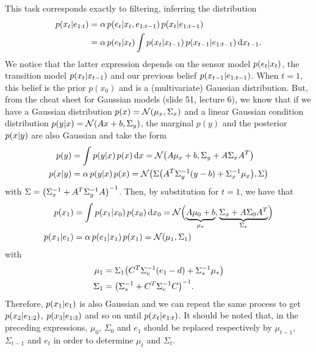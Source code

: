 \documentclass[11pt, a4paper]{article}
\begin{document}
\begin{enumerate}
    \begin{solution}
        This task corresponds exactly to filtering, \ie{} inferring the distribution
        \begin{align*}
            p(x_t \knowing e_{1:t}) & = \alpha \, p(e_t \knowing x_t, e_{1:t-1}) \, p(x_t \knowing e_{1:t-1}) \\
            & = \alpha \, p(e_t \knowing x_t) \int p(x_t \knowing x_{t-1}) \, p(x_{t-1} \knowing e_{1:t-1}) \d{x_{t-1}} .
        \end{align*}
        We notice that the latter expression depends on the sensor model $p(e_t \knowing x_t)$, the transition model $p(x_t \knowing x_{t-1})$ and our previous belief $p(x_{t-1} \knowing e_{1:t-1})$. When $t = 1$, this belief is the prior $p(x_0)$ and is a (multivariate) Gaussian distribution. But, from the cheat sheet for Gaussian models (slide 51, lecture 6), we know that if we have a Gaussian distribution $p(x) = \N(\mu_x, \Sigma_x)$ and a linear Gaussian condition distribution $p(y \knowing x) = \N(A x + b, \Sigma_y)$, the marginal $p(y)$ and the posterior $p(x \knowing y)$ are also Gaussian and take the form
        \begin{align*}
            p(y) & = \int p(y \knowing x) \, p(x) \d{x} = \N\rbk*{A \mu_x + b, \Sigma_y + A \Sigma_x A^T} \\
            p(x \knowing y) & = \alpha \, p(y \knowing x) \, p(x) = \N\rbk*{\Sigma \rbk*{A^T \Sigma_y^{-1} (y - b) + \Sigma_x^{-1} \mu_x}, \Sigma}
        \end{align*}
        with $\Sigma = \rbk*{\Sigma_x^{-1} + A^T \Sigma_y^{-1} A}^{-1}$. Then, by substitution for $t = 1$, we have that
        \begin{align*}
            p(x_1) & = \int p(x_1 \knowing x_0) \, p(x_0) \d{x_0} = \N\rbk[\Big]{\underbrace{A \mu_0 + b}_{\mu_*}, \underbrace{\Sigma_x + A \Sigma_0 A^T}_{\Sigma_*}} \\
            p(x_1 \knowing e_1) & = \alpha \, p(e_1 \knowing x_1) \, p(x_1) = \N(\mu_1, \Sigma_1)
        \end{align*}
        with
        \begin{align*}
            \mu_1 & = \Sigma_1 \rbk*{C^T \Sigma_e^{-1} (e_1 - d) + \Sigma_*^{-1} \mu_*} \\
            \Sigma_1 & = \rbk*{\Sigma_*^{-1} + C^T \Sigma_e^{-1} C}^{-1} .
        \end{align*}
        Therefore, $p(x_1 \knowing e_1)$ is also Gaussian and we can repeat the same process to get $p(x_2 \knowing e_{1:2})$, $p(x_3 \knowing e_{1:3})$ and so on until $p(x_t \knowing e_{1:t})$. It should be noted that, in the preceding expressions, $\mu_0$, $\Sigma_0$ and $e_1$ should be replaced respectively by $\mu_{t-1}$, $\Sigma_{t-1}$ and $e_t$ in order to determine $\mu_t$ and $\Sigma_t$.
    \end{solution}
    

\end{enumerate}
\end{document}
